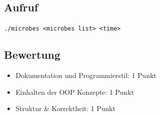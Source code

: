 \documentclass[a4paper,10pt]{article}
\begin{document}
\subsection*{Aufruf}
\texttt{./microbes <microbes list> <time>}

\subsection*{Bewertung}
\begin{itemize}
 \item Dokumentation und Programmierstil: 1 Punkt
 \item Einhalten der OOP Konzepte: 1 Punkt
 \item Struktur \& Korrektheit: 1 Punkt
\end{itemize}

\newpage
\end{document}
